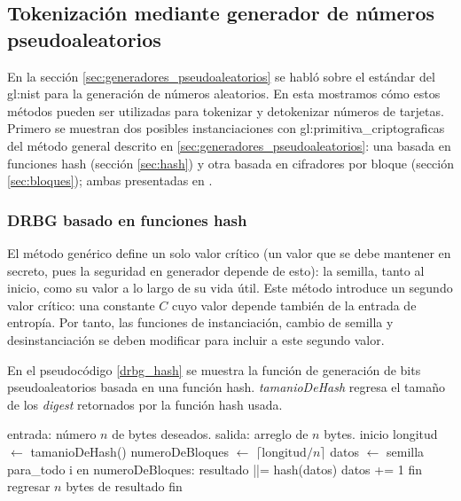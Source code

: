 %
%
%

\subsection{Tokenización mediante generador de números pseudoaleatorios}
\label{sec:drbg_lista}

En la sección \ref{sec:generadores_pseudoaleatorios} se habló sobre el
estándar del \gls{gl:nist} para la generación de números aleatorios. En esta
mostramos cómo estos métodos pueden ser utilizadas para tokenizar y detokenizar
números de tarjetas. Primero se muestran dos posibles instanciaciones
con \glspl{gl:primitiva_criptografica} del método general descrito en
\ref{sec:generadores_pseudoaleatorios}: una basada en funciones hash
(sección \ref{sec:hash}) y otra basada en cifradores por bloque (sección
\ref{sec:bloques}); ambas presentadas en \cite{nist_aleatorios}.

\subsubsection{DRBG basado en funciones hash}

El método genérico define un solo valor crítico (un valor que se debe mantener
en secreto, pues la seguridad en generador depende de esto): la semilla, tanto
al inicio, como su valor a lo largo de su vida útil. Este método introduce
un segundo valor crítico: una constante $ C $ cuyo valor depende también de
la entrada de entropía. Por tanto, las funciones de instanciación,
cambio de semilla y desinstanciación se deben modificar para incluir
a este segundo valor.

En el pseudocódigo \ref{drbg_hash} se muestra la función de generación de bits
pseudoaleatorios basada en una función hash. \textit{tamanioDeHash} regresa el
tamaño de los \textit{digest} retornados por la función hash usada.

\begin{pseudocodigo}[%
    caption={Generación de bits pseudoaleatorios mediante función hash},
    label={drbg_hash}%
  ]
    entrada: número $ n $ de bytes deseados.
    salida:  arreglo de $ n $ bytes.
    inicio
      longitud $ \gets $ tamanioDeHash()
      numeroDeBloques $ \gets $ $ \lceil \text{longitud} / n \rceil $
      datos $ \gets $ semilla
      para_todo i en numeroDeBloques:
        resultado ||= hash(datos)
        datos += 1
      fin
      regresar $ n $ bytes de resultado
    fin
\end{pseudocodigo}

